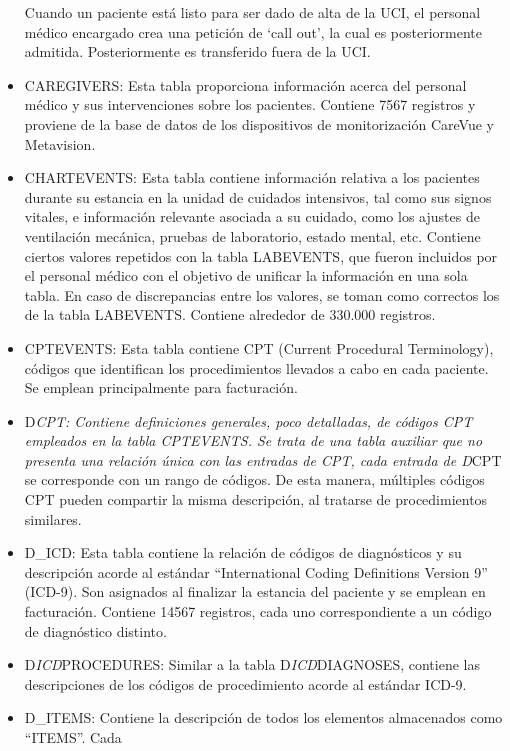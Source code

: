 \documentclass{report}
\begin{document}
\begin{itemize}
  Cuando un paciente está listo para ser dado de alta de la UCI, el
  personal médico encargado crea una petición de `call out', la cual es
  posteriormente admitida. Posteriormente es transferido fuera de la
  UCI.
\item
  CAREGIVERS: Esta tabla proporciona información acerca del personal
  médico y sus intervenciones sobre los pacientes. Contiene 7567
  registros y proviene de la base de datos de los dispositivos de
  monitorización CareVue y Metavision. 
\item
  CHARTEVENTS: Esta tabla contiene información relativa a los pacientes
  durante su estancia en la unidad de cuidados intensivos, tal como sus
  signos vitales, e información relevante asociada a su cuidado, como
  los ajustes de ventilación mecánica, pruebas de laboratorio, estado
  mental, etc. Contiene ciertos valores repetidos con la tabla
  LABEVENTS, que fueron incluidos por el personal médico con el objetivo
  de unificar la información en una sola tabla. En caso de discrepancias
  entre los valores, se toman como correctos los de la tabla LABEVENTS.
  Contiene alrededor de 330.000 registros.
\item
  CPTEVENTS: Esta tabla contiene CPT (Current Procedural Terminology),
  códigos que identifican los procedimientos llevados a cabo en cada
  paciente. Se emplean principalmente para facturación. 
\item
  D\emph{CPT: Contiene definiciones generales, poco detalladas, de
  códigos CPT empleados en la tabla CPTEVENTS. Se trata de una tabla
  auxiliar que no presenta una relación única con las entradas de CPT,
  cada entrada de D}CPT se corresponde con un rango de códigos. De esta
  manera, múltiples códigos CPT pueden compartir la misma descripción,
  al tratarse de procedimientos similares. 
\item
  D\_ICD: Esta tabla contiene la relación de códigos de diagnósticos y
  su descripción acorde al estándar ``International Coding Definitions
  Version 9'' (ICD-9). Son asignados al finalizar la estancia del
  paciente y se emplean en facturación. Contiene 14567 registros, cada
  uno correspondiente a un código de diagnóstico distinto.
\item
  D\emph{ICD}PROCEDURES: Similar a la tabla D\emph{ICD}DIAGNOSES,
  contiene las descripciones de los códigos de procedimiento acorde al
  estándar ICD-9.
\item
  D\_ITEMS: Contiene la descripción de todos los elementos almacenados
  como ``ITEMS''. Cada


\end{itemize}
\end{document}
